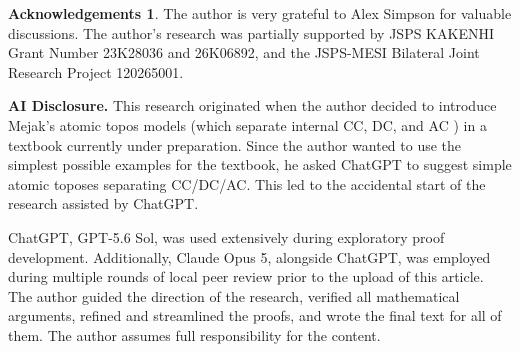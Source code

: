 \documentclass[10pt]{amsart}
\numberwithin{equation}{section}
\theoremstyle{plain}
\theoremstyle{definition}
\newtheorem*{ack}{Acknowledgements}
\begin{document}
\begin{ack}
The author is very grateful to Alex Simpson for valuable discussions.
The author's research was partially supported by JSPS KAKENHI Grant Number 23K28036 and 26K06892, and the JSPS-MESI Bilateral Joint Research Project 120265001.
\end{ack}

\medskip
\noindent
{\bf AI Disclosure.}
This research originated when the author decided to introduce Mejak's atomic topos models (which separate internal CC, DC, and AC \cite{Mej19}) in a textbook currently under preparation.
Since the author wanted to use the simplest possible examples for the textbook, he asked ChatGPT to suggest simple atomic toposes separating CC/DC/AC.
This led to the accidental start of the research assisted by ChatGPT.

ChatGPT, GPT-5.6 Sol, was used extensively during exploratory proof development.
Additionally, Claude Opus 5, alongside ChatGPT, was employed during multiple rounds of local peer review prior to the upload of this article.
The author guided the direction of the research, verified all mathematical arguments, refined and streamlined the proofs, and wrote the final text for all of them.
The author assumes full responsibility for the content.


















\end{document}
